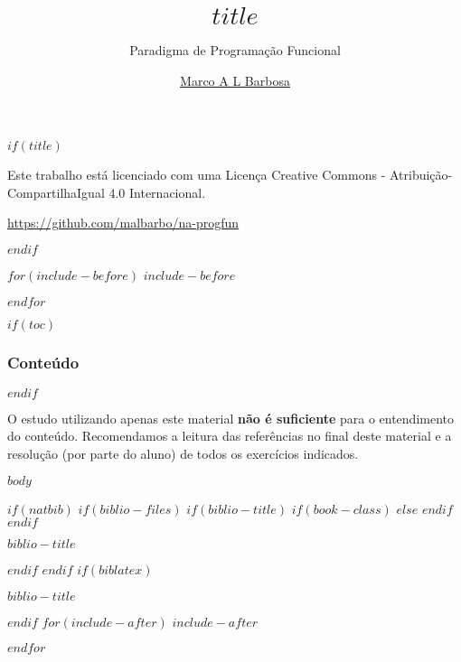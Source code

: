 \documentclass[$if(fontsize)$$fontsize$,$endif$$if(handout)$handout,$endif$$if(beamer)$ignorenonframetext,$endif$$for(classoption)$$classoption$$sep$,$endfor$]{$documentclass$}
\title{$title$}
\subtitle{Paradigma de Programação Funcional}
\author{\href{malbarbo.pro.br}{Marco A L Barbosa}}
\date{}
\begin{document}
$if(title)$
\begin{frame}[plain]
  \vspace{1.5cm}
  \titlepage
  \begin{center}
    \href{http://creativecommons.org/licenses/by-sa/4.0/}{\ccbysa}

    {\tiny
      Este trabalho está licenciado com uma Licença Creative Commons -
      Atribuição-CompartilhaIgual 4.0 Internacional.

      \url{https://github.com/malbarbo/na-progfun}
    }
  \end{center}
\end{frame}
$endif$

$for(include-before)$
$include-before$

$endfor$

$if(toc)$
\begin{frame}[plain]
  \frametitle{Conteúdo}
  \tableofcontents
\end{frame}
$endif$

\begin{frame}

  O estudo utilizando apenas este material \textbf{não é suficiente} para o
  entendimento do conteúdo. Recomendamos a leitura das referências no final
  deste material e a resolução (por parte do aluno) de todos os exercícios
  indicados.

\end{frame}

$body$

$if(natbib)$
$if(biblio-files)$
$if(biblio-title)$
$if(book-class)$
\renewcommand\bibname{$biblio-title$}
$else$
\renewcommand\refname{$biblio-title$}
$endif$
$endif$
\begin{frame}[allowframebreaks]{$biblio-title$}

\end{frame}

$endif$
$endif$
$if(biblatex)$
\begin{frame}[allowframebreaks]{$biblio-title$}
\printbibliography[heading=none]
\end{frame}

$endif$
$for(include-after)$
$include-after$

$endfor$
\end{document}

